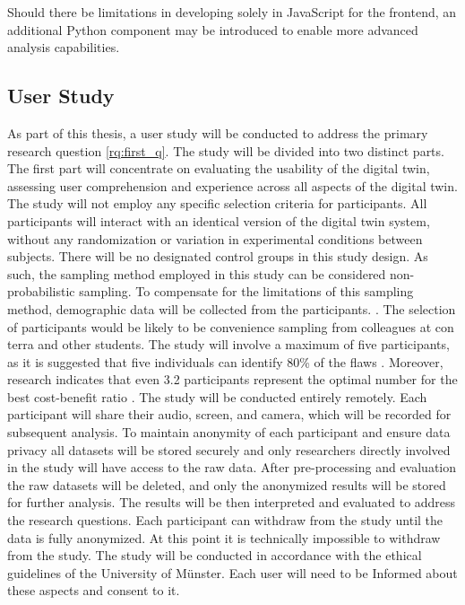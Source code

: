 \documentclass[11pt, titlepage, a4paper]{scrartcl}
\begin{document}
\begin{linenumbers}
    Should there be limitations in developing solely in JavaScript for the frontend, an additional Python component may be introduced to enable more advanced analysis capabilities.


    \subsection{User Study}
    As part of this thesis, a user study will be conducted to address the primary research question \cref{rq:first_q}. The study will be divided into two distinct parts. The first part will concentrate on evaluating the usability of the digital twin, assessing user comprehension and experience across all aspects of the digital twin.
    The study will not employ any specific selection criteria for participants. All participants will interact with an identical version of the digital twin system, without any randomization or variation in experimental conditions between subjects. There will be no designated control groups in this study design. As such, the sampling method employed in this study can be considered non-probabilistic sampling. To compensate for the limitations of this sampling method, demographic data will be collected from the participants. \cite{lazarResearchMethodsHuman2017}. The selection of participants would be likely to be convenience sampling from colleagues at con terra and other students.
    The study will involve a maximum of five participants, as it is suggested that five individuals can identify 80\% of the flaws \cite{virziRefiningTestPhase1992}. Moreover, research indicates that even 3.2 participants represent the optimal number for the best cost-benefit ratio \cite{nielsenMathematicalModelFinding1993}.
    The study will be conducted entirely remotely. Each participant will share their audio, screen, and camera, which will be recorded for subsequent analysis.
    To maintain anonymity of each participant and ensure data privacy all datasets will be stored securely and only researchers directly involved in the study will have access to the raw data. After pre-processing and evaluation the raw datasets will be deleted, and only the anonymized results will be stored for further analysis. The results will be then interpreted and evaluated to address the research questions. Each participant can withdraw from the study until the data is fully anonymized. At this point it is technically impossible to withdraw from the study. The study will be conducted in accordance with the ethical guidelines of the University of Münster. Each user will need to be Informed about these aspects and consent to it. %


\end{linenumbers}
\end{document}
